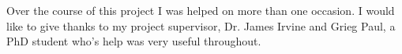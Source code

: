 \documentclass[
12pt, %
oneside, %
english, %
onespacing, %
headsepline, %
]{MastersDoctoralThesis} %
\begin{document}

\begin{acknowledgements}
\addchaptertocentry{\acknowledgementname} %

Over the course of this project I was helped on more than one occasion. I would like to give thanks to my project supervisor, Dr. James Irvine and Grieg Paul, a PhD student who's help was very useful throughout.

\end{acknowledgements}


\tableofcontents %

\listoffigures %

\listoftables %







\end{document}
